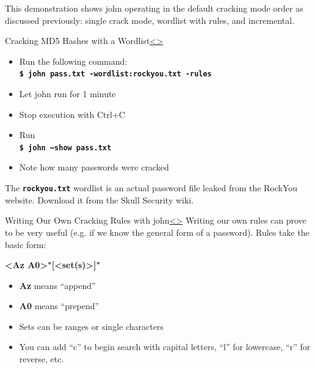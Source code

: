 \documentclass[12pt]{extarticle}
\newcommand{\code}[1]{\texttt{\bfseries#1}}
\newenvironment{instructionblock}{\Large\bgroup}{\egroup}
\begin{document}
This demonstration shows john operating in the default cracking mode order as discussed previously: single crack mode, wordlist with rules, and incremental.

\pagebreak
\begin{slide}{Cracking MD5 Hashes with a Wordlist}{\hyperref[slide 10]{\textless}\hyperref[slide 12]{\textgreater}}
	\vskip 10pt
	\begin{instructionblock}
		\begin{itemize}
			\item Run the following command:\\
				\code{\$ john pass.txt -wordlist:rockyou.txt -rules}
			\item Let john run for 1 minute
			\item Stop execution with Ctrl+C
			\item Run \\
				\code{\$ john --show pass.txt}
			\item Note how many passwords were cracked
		\end{itemize}
	\end{instructionblock}
\end{slide}
\vfill

The \code{rockyou.txt} wordlist is an actual password file leaked from the RockYou website. Download it from the Skull Security wiki. \cite{rockyou}

\pagebreak
\begin{slide}{Writing Our Own Cracking Rules with john}{\hyperref[slide 11]{\textless}\hyperref[slide 13]{\textgreater}}
	\begin{instructionblock}
	Writing our own rules can prove to be very useful (e.g. if we know the general form of a password). Rules take the basic form: 
		
			\hskip 50pt \textbf{\textless Az \textbar  A0\textgreater"[\textless set(s)\textgreater ]"}

		\begin{itemize}
			\item \textbf{Az} means ``append''
			\item \textbf{A0} means ``prepend''
			\item Sets can be ranges or single characters
			\item You can add ``c'' to begin search with capital letters, ``l'' for lowercase, ``r'' for reverse, etc. \cite{cheat}
			
		\end{itemize}
	\end{instructionblock}
\end{slide}
\vfill
\end{document}
